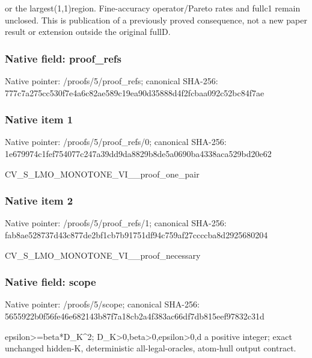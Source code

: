\documentclass[10pt,a4paper]{article}
\begin{document}
or the largest(1,\allowbreak{}1)region. Fine-accuracy operator/\allowbreak{}Pareto rates and fullc1 remain unclosed. This is publication of a previously proved consequence,\allowbreak{} not a new paper result or extension outside the original fullD.\par\endgroup

\subsubsection{Native field: proof\_\allowbreak{}refs}
Native pointer: /proofs/5/proof\_\allowbreak{}refs; canonical SHA-256: 777c7a275cc530f7e4a6c82ae589c19ea90d35888d4f2fcbaa092c52bc84f7ae

\subsubsection{Native item 1}
Native pointer: /proofs/5/proof\_\allowbreak{}refs/0; canonical SHA-256: 1e679974c1fef754077c247a39dd9da8829b8de5a0690ba4338aca529bd20e62

\begingroup\raggedright\sloppy CV\_\allowbreak{}S\_\allowbreak{}LMO\_\allowbreak{}MONOTONE\_\allowbreak{}VI\_\allowbreak{}\_\allowbreak{}proof\_\allowbreak{}one\_\allowbreak{}pair\par\endgroup

\subsubsection{Native item 2}
Native pointer: /proofs/5/proof\_\allowbreak{}refs/1; canonical SHA-256: fab8ae528737d43c877de2bf1cb7b91751df94c759af27ccccba8d2925680204

\begingroup\raggedright\sloppy CV\_\allowbreak{}S\_\allowbreak{}LMO\_\allowbreak{}MONOTONE\_\allowbreak{}VI\_\allowbreak{}\_\allowbreak{}proof\_\allowbreak{}necessary\par\endgroup

\subsubsection{Native field: scope}
Native pointer: /proofs/5/scope; canonical SHA-256: 5655922b0f56fe46e682143b87f7a18cb2a4f383ac66df7db815eef97832c31d

\begingroup\raggedright\sloppy epsilon>=\allowbreak{}beta*D\_\allowbreak{}K\textasciicircum{}2;\allowbreak{} D\_\allowbreak{}K>0,\allowbreak{}beta>0,\allowbreak{}epsilon>0,\allowbreak{}d a positive integer;\allowbreak{} exact unchanged hidden-K,\allowbreak{} deterministic all-legal-oracles,\allowbreak{} atom-hull output contract.\par\endgroup
\end{document}
